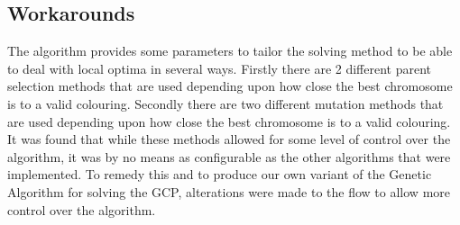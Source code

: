 \subsection{Workarounds}
The algorithm provides some parameters to tailor the solving method to be able to deal with local optima in several ways. Firstly there are 2 different parent selection methods that are used depending upon how close the best chromosome is to a valid colouring. Secondly there are two different mutation methods that are used depending upon how close the best chromosome is to a valid colouring.
It was found that while these methods allowed for some level of control over the algorithm, it was by no means as configurable as the other algorithms that were implemented. To remedy this and to produce our own variant of the Genetic Algorithm for solving the GCP, alterations were made to the flow to allow more control over the algorithm.

